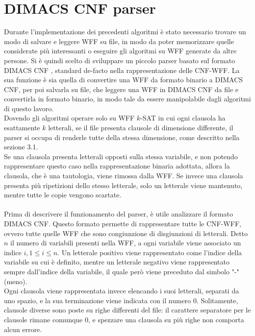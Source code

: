 \chapter{DIMACS CNF parser}
Durante l'implementazione dei precedenti algoritmi è
stato necessario trovare un modo di salvare e leggere WFF su file, in modo da poter 
memorizzare quelle considerate più interessanti o eseguire gli algoritmi su WFF generate
da altre persone.
Si è quindi scelto di sviluppare un piccolo parser basato sul formato DIMACS CNF \cite{dimacs-cnf}, 
standard de-facto nella rappresentazione delle CNF-WFF. La sua 
funzione è sia quella di convertire una WFF da formato binario a DIMACS CNF, per poi
salvarla su file, che leggere una WFF in DIMACS CNF da file e convertirla in formato 
binario, in modo tale da essere manipolabile dagli algoritmi di questo lavoro.\\
Dovendo gli algoritmi operare solo su WFF $k$-SAT in cui ogni clausola ha esattamente $k$ letterali, se il file presenta clausole di dimensione differente, il parser si occupa di renderle tutte della stessa dimensione, come descritto nella sezione 3.1.\\
Se una clausola presenta letterali opposti sulla stessa variabile, e non potendo rappresentare questo caso nella rappresentazione binaria adottata, allora la clausola, che è una tautologia, viene rimossa dalla WFF.
Se invece una clausola presenta più ripetizioni dello stesso letterale, solo un letterale viene mantenuto, mentre tutte le copie vengono scartate.\\
\\
Prima di descrivere il funzionamento del parser, è utile analizzare il formato DIMACS CNF.
Questo formato permette di rappresentare tutte le CNF-WFF, ovvero tutte quelle WFF che sono congiunzione di disgiunzioni di letterali.
Detto $n$ il numero di variabili presenti nella WFF, a ogni variabile viene associato un indice $i, 1 \le i \le n$. Un letterale positivo viene rappresentato come l'indice della variabile su cui è definito, mentre un letterale negativo viene rappresentato sempre dall'indice della variabile, il quale però viene preceduto dal simbolo "-" (meno).\\
Ogni clausola viene rappresentata invece elencando i suoi letterali, separati da uno spazio, e la sua terminazione viene indicata con il numero 0.
Solitamente, clausole diverse sono poste su righe differenti del file: il carattere separatore per le clausole rimane comunque 0, e spezzare una clausola su più righe non comporta alcun errore.\\
